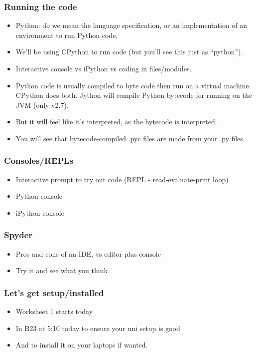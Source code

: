 \documentclass{beamer}
\begin{document}
\begin{frame}
\frametitle{Running the code}
\begin{itemize}
\item Python: do we mean the language specification, or an implementation of an
  environment to run Python code.
\item We'll be using CPython to run code (but you'll see this just as ``python'').
\item Interactive console vs iPython vs coding in files/modules.
\item Python code is usually compiled to byte code then run on a virtual
  machine. CPython does both.  Jython will compile Python bytecode for
  running on the JVM (only v2.7).
\item But it will feel like it's interpreted, as the bytecode is
  interpreted. 
\item You will see that bytecode-compiled .pyc files are made
  from your .py files.
\end{itemize}
\end{frame}


\begin{frame}
\frametitle{Consoles/REPLs}
\begin{itemize}
\item Interactive prompt to try out code (REPL - read-evaluate-print
  loop)
\item Python console 
\item iPython console
\end{itemize}
\end{frame}


\begin{frame}
\frametitle{Spyder}
\begin{itemize}
\item Pros and cons of an IDE, vs editor plus console
\item Try it and see what you think
\end{itemize}
\end{frame}




\begin{frame}
\frametitle{Let's get setup/installed}
\begin{itemize}
\item Worksheet 1 starts today
\item In B23 at 5:10 today to ensure your uni setup is good 
\item And to install it on your laptops if wanted.
\end{itemize}
\end{frame}
\end{document}
